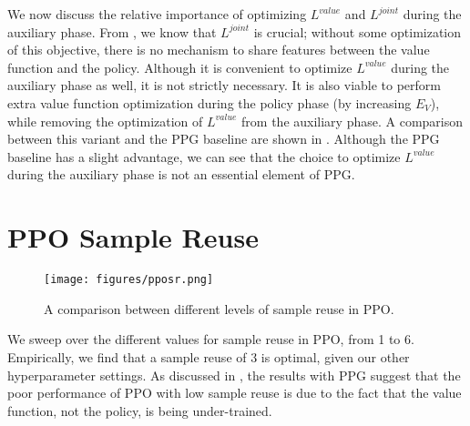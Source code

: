 \documentclass{article}
\begin{document}
We now discuss the relative importance of optimizing $L^{value}$ and $L^{joint}$ during the auxiliary phase. From , we know that $L^{joint}$ is crucial; without some optimization of this objective, there is no mechanism to share features between the value function and the policy. Although it is convenient to optimize $L^{value}$ during the auxiliary phase as well, it is not strictly necessary. It is also viable to perform extra value function optimization during the policy phase (by increasing $E_V$), while removing the optimization of $L^{value}$ from the auxiliary phase. A comparison between this variant and the PPG baseline are shown in . Although the PPG baseline has a slight advantage, we can see that the choice to optimize $L^{value}$ during the auxiliary phase is not an essential element of PPG.

\newpage
\section{PPO Sample Reuse} \label{appendix:ppo_sample_reuse}

\begin{figure*}[h]
\centering
\texttt{[image: figures/pposr.png]}
\caption{A comparison between different levels of sample reuse in PPO.}
\label{fig:pposr}
\end{figure*}

We sweep over the different values for sample reuse in PPO, from 1 to 6. Empirically, we find that a sample reuse of 3 is optimal, given our other hyperparameter settings. As discussed in , the results with PPG suggest that the poor performance of PPO with low sample reuse is due to the fact that the value function, not the policy, is being under-trained.
\end{document}
